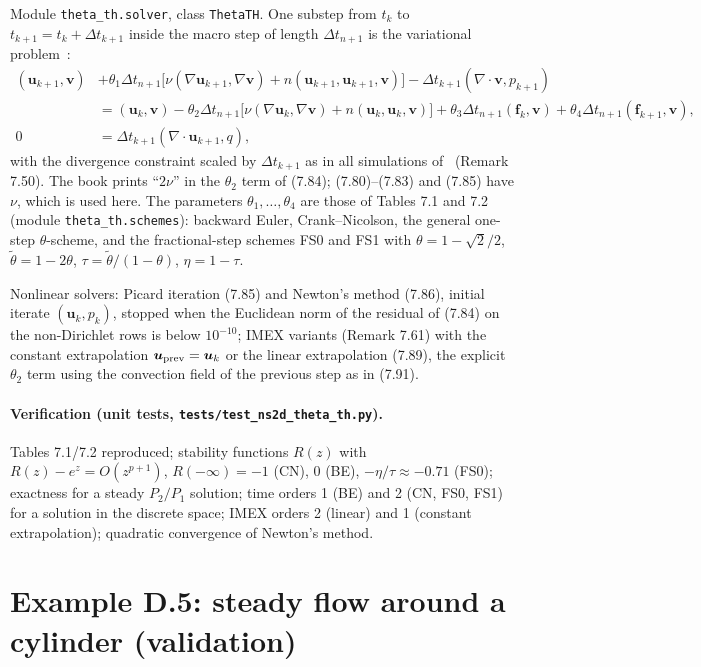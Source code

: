 \documentclass[11pt,a4paper]{article}
\newcommand{\bu}{\boldsymbol{u}}
\newcommand{\bv}{\boldsymbol{v}}
\newcommand{\bff}{\boldsymbol{f}}
\newcommand{\dt}{\Delta t}
\newcommand{\code}[1]{\texttt{#1}}
\begin{document}
Module \code{theta\_th.solver}, class \code{ThetaTH}. One substep from $t_k$ to $t_{k+1}=t_k+\dt_{k+1}$ inside the
macro step of length $\dt_{n+1}$ is the variational problem~\cite[(7.84)]{John2016}:
\begin{align*}
(\bu_{k+1},\bv)&+\theta_1\dt_{n+1}\big[\nu(\nabla\bu_{k+1},\nabla\bv)+n(\bu_{k+1},\bu_{k+1},\bv)\big]
-\dt_{k+1}(\nabla\cdot\bv,p_{k+1})\\
&=(\bu_k,\bv)-\theta_2\dt_{n+1}\big[\nu(\nabla\bu_k,\nabla\bv)+n(\bu_k,\bu_k,\bv)\big]
+\theta_3\dt_{n+1}(\bff_k,\bv)+\theta_4\dt_{n+1}(\bff_{k+1},\bv),\\
0&=\dt_{k+1}(\nabla\cdot\bu_{k+1},q),
\end{align*}
with the divergence constraint scaled by $\dt_{k+1}$ as in all simulations of~\cite{John2016} (Remark 7.50).
The book prints ``$2\nu$'' in the $\theta_2$ term of (7.84); (7.80)--(7.83) and (7.85) have $\nu$, which is used here.
The parameters $\theta_1,\dots,\theta_4$ are those of Tables 7.1 and 7.2 (module \code{theta\_th.schemes}):
backward Euler, Crank--Nicolson, the general one-step $\theta$-scheme, and the fractional-step schemes FS0 and FS1
with $\theta=1-\sqrt2/2$, $\tilde\theta=1-2\theta$, $\tau=\tilde\theta/(1-\theta)$, $\eta=1-\tau$.

Nonlinear solvers: Picard iteration (7.85) and Newton's method (7.86), initial iterate $(\bu_k,p_k)$, stopped when
the Euclidean norm of the residual of (7.84) on the non-Dirichlet rows is below $10^{-10}$; IMEX variants
(Remark 7.61) with the constant extrapolation $\bu_{\rm prev}=\bu_k$ or the linear extrapolation (7.89), the explicit
$\theta_2$ term using the convection field of the previous step as in (7.91).

\paragraph{Verification (unit tests, \code{tests/test\_ns2d\_theta\_th.py}).}
Tables 7.1/7.2 reproduced; stability functions $R(z)$ with $R(z)-e^z=O(z^{p+1})$, $R(-\infty)=-1$ (CN), $0$ (BE),
$-\eta/\tau\approx-0.71$ (FS0); exactness for a steady $P_2/P_1$ solution; time orders 1 (BE) and 2 (CN, FS0, FS1)
for a solution in the discrete space; IMEX orders 2 (linear) and 1 (constant extrapolation); quadratic convergence of
Newton's method.

\section{Example D.5: steady flow around a cylinder (validation)}
\end{document}
